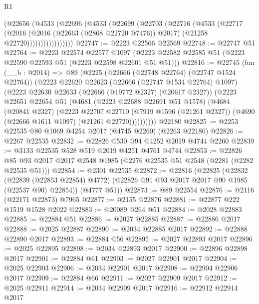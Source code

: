 \begin{lexlean}{R1}
\begin{coremodule}
                (@22656
                  (@4533
                    (@22696
                      (@4533
                        (@22699
                          (@22703
                            (@22716
                              (@4533
                                (@22717
                                  (@2016
                                    (@2016 (@22663 (@2868 @22720 @7476)) @2017)
                                    (@21258 @22720)))))))))))))))))
@22747 := @2223 @22566 @22569
@22748 := @22747 @51
@22764 := @2223
    @22574
    @22577
    @1097
    (@2223 @22582 @22585 @51 (@2223 @22590 @22593 @51 (@2223 @22598 @22601 @51 @51)))
@22816 := @22745
    (fun (__b : @2014) =>
    @89
      (@2225
        (@22666 (@22748 @22764) (@22747 @1524 @22764))
        (@2223
          @22620
          @22623
          (@22666 (@22747 @1534 @22764) @1097)
          (@2223
            @22630
            @22633
            (@22666 (@19772 @2327) (@20617 @2327))
            (@2223
              @22651
              @22654
              @51
              (@4681
                (@2223 @22688 @22691 @51 @1578)
                (@4684
                  (@20841 @2327)
                  (@2223
                    @22707
                    @22710
                    (@7919 @1596 (@21261 @2327))
                    (@4690 (@22666 @1611 @1097) (@21261 @22720))))))))))
    @22180
@22825 := @2253 @22535 @80 @1069 @4254 @2017 (@4745 @2260) (@2263 @22180)
@22826 := @2267 @22535
@22832 := @22826 @530 @94 @4252 @2019 @4744 @2260
@22839 := @3133 @22535 @528 @519 @2019 @4251 @4761 @4744
@22853 := @22826 @85 @93 @2017 @2017 @2548 @1985 (@2276 @22535 @51 @2548 (@2281 (@2282 @22535 @51)))
@22854 := @2301 @22535
@22872 := @22816
    (@22825
      (@22832
        (@22839 (@22853 @22854) @4772)
        (@22826 @91 @93 @2017 @2017 @90 @1985 (@22537 @90) @22854))
      (@4777 @51))
@22873 := @89 @22554
@22876 := @2116 (@22171 @22873) @7965
@22877 := @2155 @22876
@22881 := @22877 @222 @1519 @1528 @2022
@22883 := @20089 @264 @51
@22884 := @2028 @22883
@22885 := @22884 @51
@22886 := @2027 @22885
@22887 := @22886 @2017
@22888 := @2025 @22887
@22890 := @2034 @22885 @2017
@22892 := @22888 @22890 @2017
@22893 := @22884 @56
@22895 := @2027 @22893 @2017
@22896 := @2025 @22895
@22898 := @2034 @22893 @2017
@22900 := @22896 @22898 @2017
@22901 := @22884 @61
@22903 := @2027 @22901 @2017
@22904 := @2025 @22903
@22906 := @2034 @22901 @2017
@22908 := @22904 @22906 @2017
@22909 := @22884 @66
@22911 := @2027 @22909 @2017
@22912 := @2025 @22911
@22914 := @2034 @22909 @2017
@22916 := @22912 @22914 @2017

\end{coremodule}
\end{lexlean}
